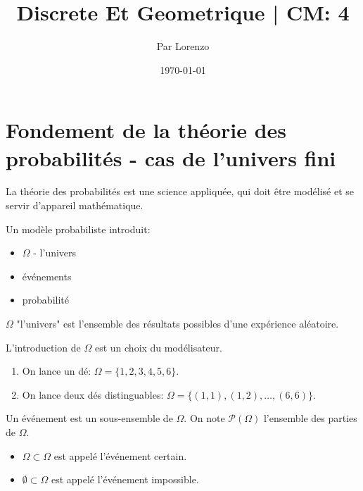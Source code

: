 \documentclass[a4paper, 12pt]{article}
\title{Discrete Et Geometrique | CM: 4}
\author{Par Lorenzo}
\date{\today}
\begin{document}
\maketitle

\section{Fondement de la théorie des probabilités - cas de l'univers fini}

La théorie des probabilités est une science appliquée, qui doit être modélisé et se servir d'appareil mathématique.

Un modèle probabiliste introduit:
\begin{itemize}
    \item $\Omega$ - l'univers
    \item événements
    \item probabilité
\end{itemize}

\begin{definition}
    $\Omega$ "l'univers" est l'ensemble des résultats possibles d'une expérience aléatoire.
\end{definition}

\begin{remark}
    L'introduction de $\Omega$ est un choix du modélisateur.
\end{remark}

\begin{example}
    \begin{enumerate}
        \item On lance un dé: $\Omega = \{1, 2, 3, 4, 5, 6\}$.
        \item On lance deux dés distinguables: $\Omega = \{(1, 1), (1, 2), \ldots, (6, 6)\}$.
    \end{enumerate}
\end{example}

\begin{definition}
    Un événement est un sous-ensemble de $\Omega$. On note $\mathcal{P}(\Omega)$ l'ensemble des parties de $\Omega$.
\end{definition}

\begin{remark}
    \begin{itemize}
        \item $\Omega \subset \Omega$ est appelé l'événement certain.
        \item $\emptyset \subset \Omega$ est appelé l'événement impossible.
    \end{itemize}
\end{remark}
\end{document}

